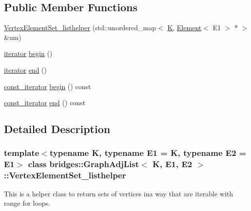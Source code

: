 \subsection*{Public Member Functions}
\begin{DoxyCompactItemize}
\item 
\mbox{\hyperlink{classbridges_1_1_graph_adj_list_1_1_vertex_element_set__listhelper_aad766132f1eb8eef63d8b5aae1131db0}{Vertex\+Element\+Set\+\_\+listhelper}} (std\+::unordered\+\_\+map$<$ \mbox{\hyperlink{namespacebridges_acfb0a4f7877d8f63de3e6862004c50edaa5f3c6a11b03839d46af9fb43c97c188}{K}}, \mbox{\hyperlink{classbridges_1_1_element}{Element}}$<$ E1 $>$ $\ast$ $>$ \&um)
\item 
\mbox{\hyperlink{classbridges_1_1_graph_adj_list_1_1_vertex_element_set__listhelper_1_1iterator}{iterator}} \mbox{\hyperlink{classbridges_1_1_graph_adj_list_1_1_vertex_element_set__listhelper_ad9feeff9bb589dc9d13d1dd562a0e7ea}{begin}} ()
\item 
\mbox{\hyperlink{classbridges_1_1_graph_adj_list_1_1_vertex_element_set__listhelper_1_1iterator}{iterator}} \mbox{\hyperlink{classbridges_1_1_graph_adj_list_1_1_vertex_element_set__listhelper_aea97cdb87e88d3848e6451d1cfc62f2d}{end}} ()
\item 
\mbox{\hyperlink{classbridges_1_1_graph_adj_list_1_1_vertex_element_set__listhelper_1_1const__iterator}{const\+\_\+iterator}} \mbox{\hyperlink{classbridges_1_1_graph_adj_list_1_1_vertex_element_set__listhelper_a9021945bdb83e3735fbc9b9a42f39a39}{begin}} () const
\item 
\mbox{\hyperlink{classbridges_1_1_graph_adj_list_1_1_vertex_element_set__listhelper_1_1const__iterator}{const\+\_\+iterator}} \mbox{\hyperlink{classbridges_1_1_graph_adj_list_1_1_vertex_element_set__listhelper_a7aff73080f67bec16219fd17d7f8bfd7}{end}} () const
\end{DoxyCompactItemize}


\subsection{Detailed Description}
\subsubsection*{template$<$typename K, typename E1 = K, typename E2 = E1$>$\newline
class bridges\+::\+Graph\+Adj\+List$<$ K, E1, E2 $>$\+::\+Vertex\+Element\+Set\+\_\+listhelper}

This is a helper class to return sets of vertices ina way that are iterable with range for loops. 

